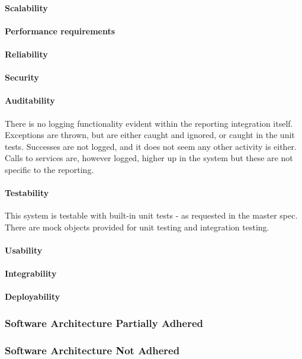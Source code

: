 \documentclass{article}
\begin{document}
            \paragraph{Scalability}
            \paragraph{Performance requirements}
            \paragraph{Reliability}
            \paragraph{Security}
            \paragraph{Auditability}
            There is no logging functionality evident within the reporting integration itself. Exceptions are thrown, but are either caught and ignored, or caught in the unit tests. Successes are not logged, and it does not seem any other activity is either. Calls to services are, however logged, higher up in the system but these are not specific to the reporting.
            \paragraph{Testability}
            This system is testable with built-in unit tests - as requested in the master spec. There are mock objects provided for unit testing and integration testing.
            \paragraph{Usability}
            \paragraph{Integrability}
            \paragraph{Deployability}
        \subsubsection{Software Architecture Partially Adhered}
        \subsubsection{Software Architecture Not Adhered}       
        
\end{document}
